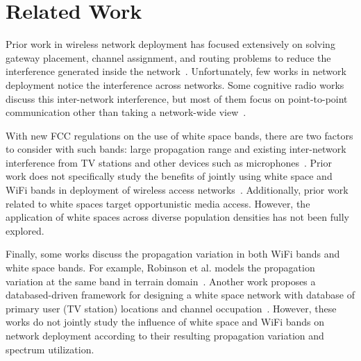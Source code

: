 \section{Related Work}
\label{sec:related}

Prior work in wireless network deployment has focused extensively on solving gateway placement, 
channel assignment, and routing problems to reduce the interference 
generated inside the network~\cite{he2008optimizing,ramachandran2006interference,akyildiz2006next}.
Unfortunately, few works in network deployment notice the 
interference across networks. Some cognitive radio works discuss this inter-network
interference, but most of them focus on point-to-point communication other than taking a network-wide view~\cite{cabric2004implementation}.

With new FCC regulations on the use of white space bands, there are two factors to
consider with such bands: large propagation range and existing inter-network interference from 
TV stations and other devices such as microphones~\cite{fccwhitespace,cui2013leveraging,bahl2009white}.
Prior work does not specifically study the benefits of jointly using white space and WiFi bands in
deployment of wireless access networks~\cite{akyildiz2005wireless}. Additionally, prior work related
to white spaces target opportunistic media access. However, the application of white spaces 
across diverse population densities has not been fully explored.
 
Finally, some works discuss the propagation variation in both WiFi bands and white space bands.
For example, Robinson et al. models the propagation variation at the same band in terrain 
domain~\cite{robinson2010deploying}. Another work proposes a databased-driven framework for
designing a white space network with database of primary user (TV station) locations and channel 
occupation~\cite{murty2012senseless}. However, these works do not jointly study
the influence of white space and WiFi bands on network deployment according to their resulting 
propagation variation and spectrum utilization.



